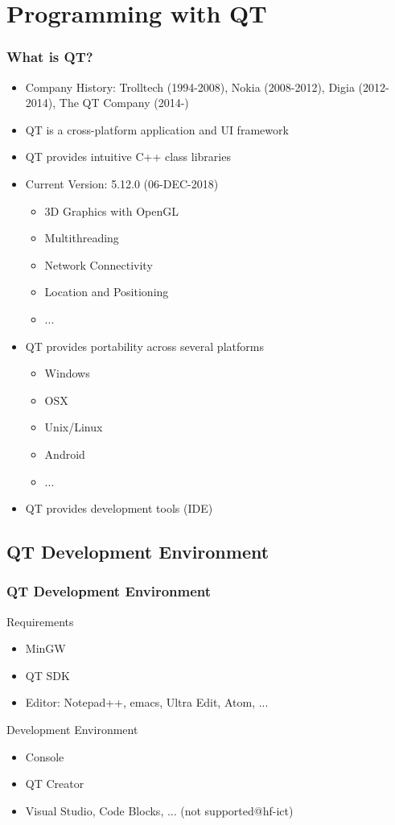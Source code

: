 \section{Programming with QT}

\frame
{
\frametitle{What is QT?}
\begin{itemize}
\item Company History: Trolltech (1994-2008), Nokia (2008-2012), Digia (2012-2014), The QT Company (2014-)
\item QT is a cross-platform application and UI framework
\item QT provides intuitive C++ class libraries
\item Current Version: 5.12.0 (06-DEC-2018)
{\tiny
\begin{itemize}
\item 3D Graphics with OpenGL
\item Multithreading
\item Network Connectivity
\item Location and Positioning
\item ...
\end{itemize}
}
\item QT provides portability across several platforms\\
\begin{itemize}
\item Windows
\item OSX
\item Unix/Linux
\item Android
\item ...
\end{itemize}
\item QT provides development tools (IDE)
\end{itemize}
}

\subsection{QT Development Environment}
\frame
{
\frametitle{QT Development Environment}
Requirements
\begin{itemize}
\item MinGW
\item QT SDK
\item Editor: Notepad++, emacs, Ultra Edit, Atom, ...
\end{itemize}
\vspace{5mm}
Development Environment
\begin{itemize}
\item Console
\item QT Creator
\item Visual Studio, Code Blocks, ... (not supported@hf-ict)
\end{itemize}
}

